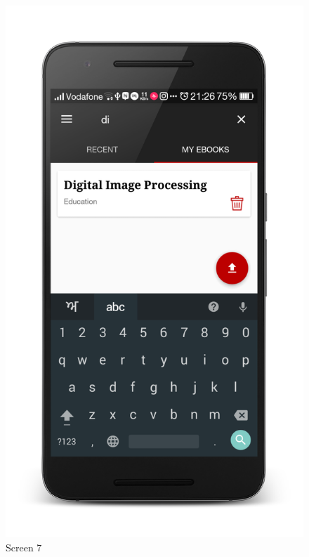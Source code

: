 \begin{figure}[ht]
\centering
\includegraphics[scale=0.13]{images/d11.png}
\caption{Screen 7}
\end{figure}

\newpage

